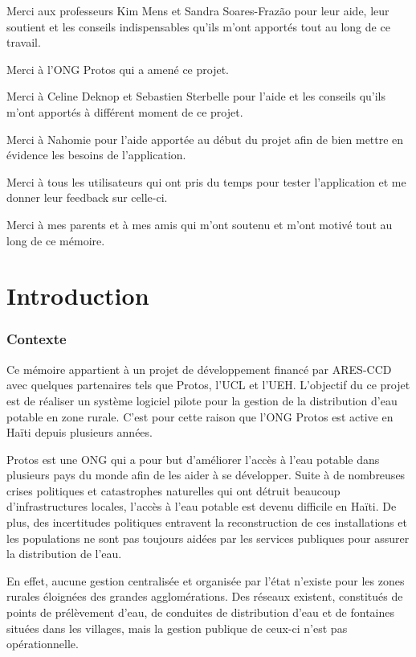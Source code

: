 \documentclass{EPL-master-thesis-covers-FR}
\begin{document}
		Merci aux professeurs Kim Mens et Sandra Soares-Frazão pour leur aide, leur soutient et les conseils indispensables qu'ils m'ont apportés tout au long de ce travail.
		
		Merci à l'ONG Protos qui a amené ce projet.
		
		Merci à Celine Deknop et Sebastien Sterbelle pour l'aide et les conseils qu'ils m'ont apportés à différent moment de ce projet.
		
		Merci à Nahomie pour l'aide apportée au début du projet afin de bien mettre en évidence les besoins de l'application.
		
		Merci à tous les utilisateurs qui ont pris du temps pour tester l'application et me donner leur feedback sur celle-ci.
		
		Merci à mes parents et à mes amis qui m'ont soutenu et m'ont motivé tout au long de ce mémoire.

		

	\printnoidxglossary[title=Glossaire, toctitle=Glossaire]
	\glsaddall

	\chapter{Introduction}

		
		\subsection*{Contexte}
		
			Ce mémoire appartient à un projet de développement financé par ARES-CCD avec quelques partenaires tels que Protos, l'UCL et l'UEH. L'objectif du ce projet est de réaliser un système logiciel pilote pour la gestion de la distribution d'eau potable en zone rurale. C'est pour cette raison que l'ONG Protos est active en Haïti depuis plusieurs années.
			
			Protos est une ONG qui a pour but d'améliorer l'accès à l'eau potable dans plusieurs pays du monde afin de les aider à se développer. Suite à de nombreuses crises politiques et catastrophes naturelles qui ont détruit beaucoup d'infrastructures locales, l'accès à l'eau potable est devenu difficile en Haïti. De plus, des incertitudes politiques entravent la reconstruction de ces installations et les populations ne sont pas toujours aidées par les services publiques pour assurer la distribution de l'eau. 
			
			 En effet, aucune gestion centralisée et organisée par l'état n'existe pour les zones rurales éloignées des grandes agglomérations. Des réseaux existent, constitués de points de prélèvement d'eau, de conduites de distribution d'eau et de fontaines situées dans les villages, mais la gestion publique de ceux-ci n'est pas opérationnelle. 
\end{document}
